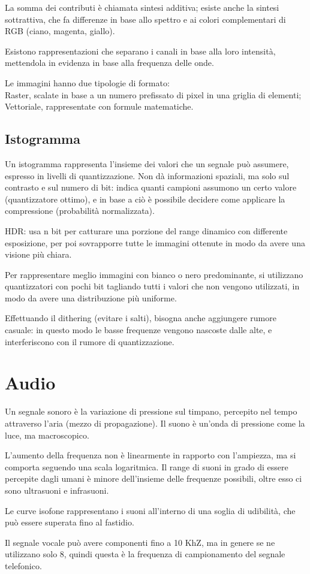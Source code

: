 La somma dei contributi è chiamata sintesi additiva; esiste anche la sintesi sottrattiva, che fa differenze in base allo spettro e ai colori complementari di RGB (ciano, magenta, giallo). 

Esistono rappresentazioni che separano i canali in base alla loro intensità, mettendola in evidenza in base alla frequenza delle onde. 

Le immagini hanno due tipologie di formato: \\
Raster, scalate in base a un numero prefissato di pixel in una griglia di elementi; \\
Vettoriale, rappresentate con formule matematiche.
   
\subsection{Istogramma}
Un istogramma rappresenta l'insieme dei valori che un segnale può assumere, espresso in livelli di quantizzazione. Non dà informazioni spaziali, ma solo sul contrasto e sul numero di bit: indica quanti campioni assumono un certo valore (quantizzatore ottimo), e in base a ciò è possibile decidere come applicare la compressione (probabilità normalizzata).

HDR: usa n bit per catturare una porzione del range dinamico con differente esposizione, per poi sovrapporre tutte le immagini ottenute in modo da avere una visione più chiara. 

Per rappresentare meglio immagini con bianco o nero predominante, si utilizzano quantizzatori con pochi bit tagliando tutti i valori che non vengono utilizzati, in modo da avere una distribuzione più uniforme. 

Effettuando il dithering (evitare i salti), bisogna anche aggiungere rumore casuale: in questo modo le basse frequenze vengono nascoste dalle alte, e interferiscono con il rumore di quantizzazione.

\section{Audio}
Un segnale sonoro è la variazione di pressione sul timpano, percepito nel tempo attraverso l'aria (mezzo di propagazione). Il suono è un'onda di pressione come la luce, ma macroscopico.

L'aumento della frequenza non è linearmente in rapporto con l'ampiezza, ma si comporta seguendo una scala logaritmica. Il range di suoni in grado di essere percepite dagli umani è minore dell'insieme delle frequenze possibili, oltre esso ci sono ultrasuoni e infrasuoni. 

Le curve isofone rappresentano i suoni all'interno di una soglia di udibilità, che può essere superata fino al fastidio. 

Il segnale vocale può avere componenti fino a 10 KhZ, ma in genere se ne utilizzano solo 8, quindi questa è la frequenza di campionamento del segnale telefonico. 






